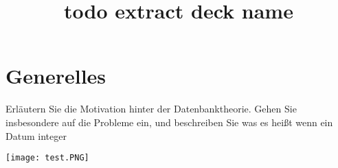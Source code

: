 \documentclass{article}
\title{todo extract deck name}
\begin{document}
\section{Generelles}
\begin{tcolorbox}[colback=white!10!white,colframe=lightgray!75!black,
  savelowerto=\jobname_ex.tex]

\begin{center}
 Erläutern Sie die Motivation hinter der Datenbanktheorie. Gehen Sie insbesondere auf die 
Probleme ein, und beschreiben Sie was es heißt wenn ein Datum integer

\end{center}

\tcblower

\justifying

\texttt{[image: test.PNG]}
\end{tcolorbox}
\end{document}
